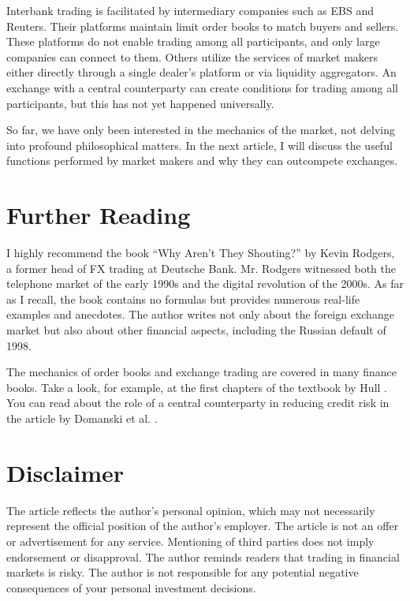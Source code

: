 \documentclass[a4paper,14pt]{extarticle}
\begin{document}
Interbank trading is facilitated by intermediary companies such as EBS and 
Reuters. Their platforms maintain limit order books to match buyers and sellers. 
These platforms do not enable trading among all participants, and only large 
companies can connect to them. Others utilize the services of market makers 
either directly through a single dealer's platform or via liquidity aggregators. 
An exchange with a central counterparty can create conditions for trading among 
all participants, but this has not yet happened universally.

So far, we have only been interested in the mechanics of the market, not delving 
into profound philosophical matters. In the next article, I will discuss the 
useful functions performed by market makers and why they can outcompete 
exchanges.

\section*{Further Reading}

I highly recommend the book ``Why Aren't They Shouting?'' \cite{rodgers2016why}
by Kevin Rodgers, a 
former head of FX trading at Deutsche Bank. Mr. Rodgers witnessed both the 
telephone market of the early 1990s and the digital revolution of the 2000s. As 
far as I recall, the book contains no formulas but provides numerous real-life 
examples and anecdotes. The author writes not only about the foreign exchange 
market but also about other financial aspects, including the Russian default of 
1998.

The mechanics of order books and exchange trading are covered in many finance 
books. Take a look, for example, at the first chapters of the textbook by Hull 
\cite[ch. 1-2]{hull2015options}. You can read about the role of a central 
counterparty in reducing credit risk in the article by Domanski et al. 
\cite{domanski2015central}.

\section*{Disclaimer}

The article reflects the author's personal opinion, which may not necessarily 
represent the official position of the author's employer. The article is not an 
offer or advertisement for any service. Mentioning of third parties does not 
imply endorsement or disapproval. The author reminds readers that trading in 
financial markets is risky. The author is not responsible for any potential 
negative consequences of your personal investment decisions.

\printbibliography
\end{document}
